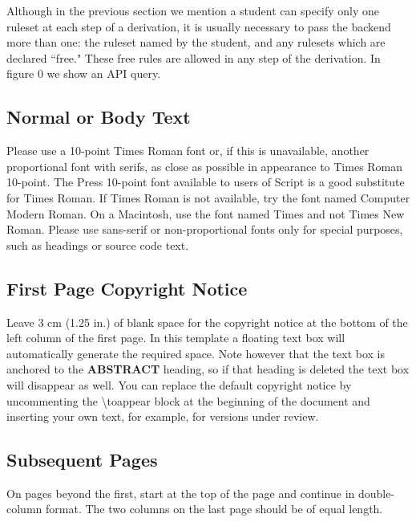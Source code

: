 \documentclass{sigchi}
\begin{document}
Although in the previous section we mention a student can specify only one ruleset at each step of a derivation, it is usually necessary to pass the backend more than one: the ruleset named by the student, and any rulesets which are declared ``free." These free rules are allowed in any step of the derivation. In figure 0 we show an API query.




\subsection{Normal or Body Text}

Please use a 10-point Times Roman font or, if this is unavailable,
another proportional font with serifs, as close as possible in
appearance to Times Roman 10-point. The Press 10-point font available
to users of Script is a good substitute for Times Roman. If Times
Roman is not available, try the font named Computer Modern Roman. On a
Macintosh, use the font named Times and not Times New Roman. Please
use sans-serif or non-proportional fonts only for special purposes,
such as headings or source code text.

\subsection{First Page Copyright Notice}

Leave 3 cm (1.25 in.) of blank space for the copyright notice at the
bottom of the left column of the first page. In this template a
floating text box will automatically generate the required space. Note
however that the text box is anchored to the \textbf{ABSTRACT}
heading, so if that heading is deleted the text box will disappear as
well.  You can replace the default copyright notice by uncommenting
the {\textbackslash}toappear block at the beginning of the document
and inserting your own text, for example, for versions under review.

\subsection{Subsequent Pages}

On pages beyond the first, start at the top of the page and continue
in double-column format.  The two columns on the last page should be
of equal length.
\end{document}
